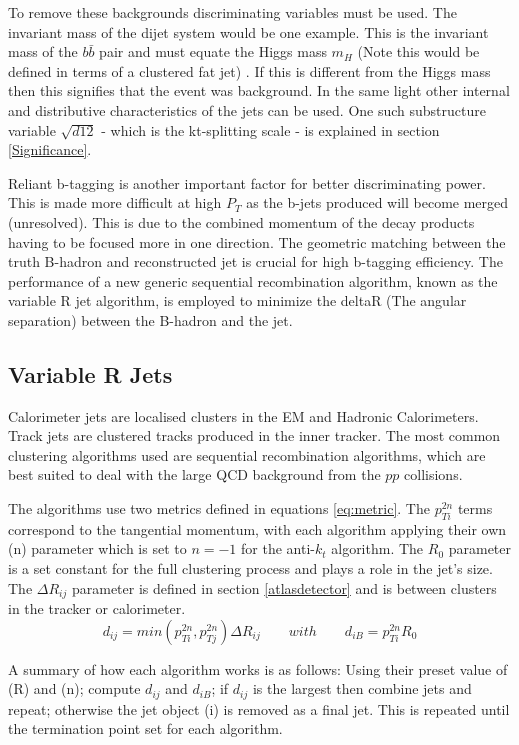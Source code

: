 To remove these backgrounds discriminating variables must be used. The invariant mass of the dijet system would be one example. This is the invariant mass of the $b\bar{b}$ pair and must equate the Higgs mass $m_{H}$ (Note this would be defined in terms of a clustered fat jet) . If this is different from the Higgs mass then this signifies that the event was background. In the same light other internal and distributive characteristics of the jets can be used. One such substructure variable $\sqrt{d12}$ - which is the kt-splitting scale - is explained in section \ref{Significance}. 

Reliant b-tagging is another important factor for better discriminating power. This is made more difficult at high $P_T$ as the b-jets produced will become merged (unresolved). This is due to the combined momentum of the decay products having to be focused more in one direction. The geometric matching between the truth B-hadron and reconstructed jet is crucial for high b-tagging efficiency. The performance of a new generic sequential recombination algorithm, known as the variable R jet algorithm, is employed to minimize the deltaR (The angular separation) between the B-hadron and the jet.

\subsection{Variable R Jets}
\label{VarR}
Calorimeter jets are localised clusters in the EM and Hadronic Calorimeters. Track jets are clustered tracks produced in the inner tracker. The most common clustering algorithms used are sequential recombination algorithms, which are best suited to deal with the large QCD background from the $pp$ collisions.


 The algorithms use two metrics defined in equations \ref{eq:metric}. The $p^{2n}_{Ti}$ terms correspond to the tangential momentum, with each algorithm applying their own (n) parameter which is set to $n=-1$ for the anti-$k_t$ algorithm. The $R_0$ parameter is a set constant for the full clustering process and plays a role in the jet's size. The $\Delta R_{ij}$ parameter is defined in section \ref{atlasdetector} and is between clusters in the tracker or calorimeter.
\begin{equation}
\displaystyle
d_{ij} = min(p_{Ti}^{2n},p_{Tj}^{2n})\Delta R_{ij}  \qquad  with \qquad d_{iB} = p_{Ti}^{2n}R_0 
\label{eq:metric}
\end{equation}

A summary of how each algorithm works is as follows: Using their preset value of (R) and (n); compute $d_{ij}$ and $d_{iB}$; if $d_{ij}$ is the largest then combine jets and repeat; otherwise the jet object (i) is removed as a final jet. This is repeated until the termination point set for each algorithm.

